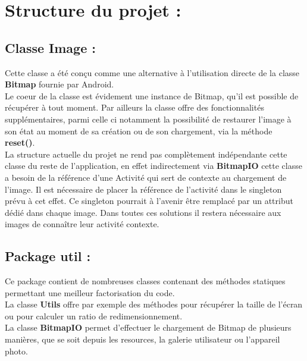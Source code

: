 \section{Structure du projet :}

\subsection{Classe \textbf{Image} :}
Cette classe a été conçu comme une alternative à l'utilisation directe de la classe \textbf{Bitmap} fournie par Android.
\\
Le coeur de la classe est évidement une instance de Bitmap, qu'il est possible de récupérer à tout moment. Par ailleurs la classe offre des fonctionnalités supplémentaires, parmi celle ci notamment la possibilité de restaurer l'image à son état au moment de sa création ou de son chargement, via la méthode \textbf{reset()}.
\\

La structure actuelle du projet ne rend pas complètement indépendante cette classe du reste de l'application, en effet indirectement via \textbf{BitmapIO} cette classe a besoin de la référence d'une Activité qui sert de contexte au chargement de l'image. Il est nécessaire de placer la référence de l'activité dans le singleton prévu à cet effet. Ce singleton pourrait à l'avenir être remplacé par un attribut dédié dans chaque image. Dans toutes ces solutions il restera nécessaire aux images de connaître leur activité contexte.

\subsection{Package \textbf{util} :}
Ce package contient de nombreuses classes contenant des méthodes statiques permettant une meilleur factorisation du code.
\\
La classe \textbf{Utils} offre par exemple des méthodes pour récupérer la taille de l'écran ou pour calculer un ratio de redimensionnement.
\\
La classe \textbf{BitmapIO} permet d'effectuer le chargement de Bitmap de plusieurs manières, que se soit depuis les resources, la galerie utilisateur ou l'appareil photo.